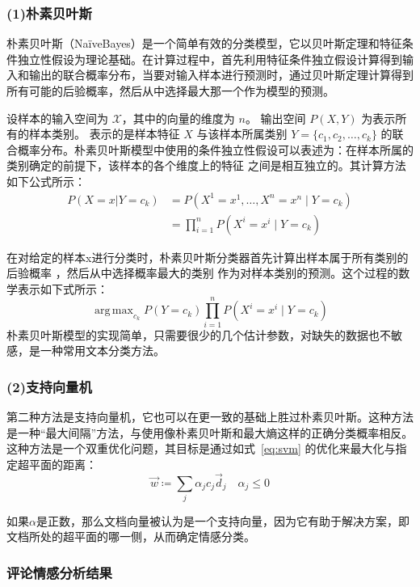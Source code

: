 \documentclass[cs4size,a4paper]{ctexart}
\DeclareMathOperator*{\argmax}{arg\,max}
\numberwithin{equation}{section}
\numberwithin{table}{section}
\numberwithin{figure}{section}
\begin{document}
\subsubsection*{(1)朴素贝叶斯}

朴素贝叶斯（NaïveBayes）是一个简单有效的分类模型，它以贝叶斯定理和特征条件独立性假设为理论基础。在计算过程中，首先利用特征条件独立假设计算得到输入和输出的联合概率分布，当要对输入样本进行预测时，通过贝叶斯定理计算得到所有可能的后验概率，然后从中选择最大那一个作为模型的预测。

设样本的输入空间为 $\mathcal{X}$，其中的向量的维度为 $n$。
输出空间 $P(X,Y)$ 为表示所有的样本类别。
表示的是样本特征 $X$ 与该样本所属类别 $Y=\{c_1,c_2, \dots ,c_k\}$ 的联合概率分布。朴素贝叶斯模型中使用的条件独立性假设可以表述为：在样本所属的类别确定的前提下，该样本的各个维度上的特征 之间是相互独立的。其计算方法如下公式所示：
\begin{align}\label{eq:bayesian}
  P(X=x | Y=c_k) &= P(X^{1}=x^1,\dots,X^{n}=x^n \mid Y=c_k)\\
  &= \prod_{i=1}^{n}P(X^{i}=x^{i} \mid Y=c_k)
\end{align}

在对给定的样本x进行分类时，朴素贝叶斯分类器首先计算出样本属于所有类别的后验概率 ，然后从中选择概率最大的类别 作为对样本类别的预测。这个过程的数学表示如下式所示：
\begin{equation}\label{eq:WeightBayesian}
  \argmax_{c_k}P(Y=c_k)\prod_{i=1}^{n}P(X^{i}=x^{i} \mid Y=c_k)
\end{equation}
朴素贝叶斯模型的实现简单，只需要很少的几个估计参数，对缺失的数据也不敏感，是一种常用文本分类方法。

\subsubsection*{(2)支持向量机}

第二种方法是支持向量机，它也可以在更一致的基础上胜过朴素贝叶斯。这种方法是一种“最大间隔”方法，与使用像朴素贝叶斯和最大熵这样的正确分类概率相反。这种方法是一个双重优化问题，其目标是通过如式~\ref{eq:svm}
的优化来最大化与指定超平面的距离：
\begin{equation}\label{eq:svm}
  \vec{w} \coloneqq \sum_{j}\alpha_{j}c_{j}\vec{d}_{j} \quad \alpha_{j}  \leq  0
\end{equation}

如果$\alpha$是正数，那么文档向量被认为是一个支持向量，因为它有助于解决方案，即文档所处的超平面的哪一侧，从而确定情感分类。

\subsubsection{评论情感分析结果}~\label{subsec:sentiment_result}
\end{document}
